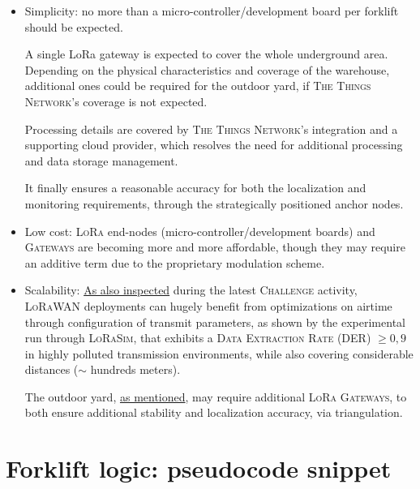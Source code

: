 \documentclass[a4paper,11pt]{article} %
\begin{document}
\begin{itemize}
    \item Simplicity: no more than a micro-controller/development board per forklift should be expected.

        A single LoRa gateway is expected to cover the whole underground area. Depending on the physical characteristics and coverage of the warehouse, additional ones could be required for the outdoor yard, if \textsc{The Things Network}'s coverage is not expected.

        Processing details are covered by \textsc{The Things Network}'s integration and a supporting cloud provider, which resolves the need for additional processing and data storage management.

        It finally ensures a reasonable accuracy for both the localization and monitoring requirements, through the strategically positioned anchor nodes.
    \item Low cost: \textsc{LoRa} end-nodes (micro-controller/development boards) and \textsc{Gateways} are becoming more and more affordable, though they may require an additive term due to the proprietary modulation scheme.
    \item Scalability: \hyperref[challenge-lorasim]{As also inspected} during the latest \textsc{Challenge} activity, \textsc{LoRaWAN} deployments can hugely benefit from optimizations on airtime through configuration of transmit parameters, as shown by the experimental run through \textsc{LoRaSim}, that exhibits a \textsc{Data Extraction Rate (DER)} $\geq 0,9$ in highly polluted transmission environments, while also covering considerable distances ($\sim$ hundreds meters).

        The outdoor yard, \hyperref[communication]{as mentioned}, may require additional \textsc{LoRa Gateways}, to both ensure additional stability and localization accuracy, via triangulation.
\end{itemize}

\section{Forklift logic: pseudocode snippet}\label{pseudocode}
\end{document}
